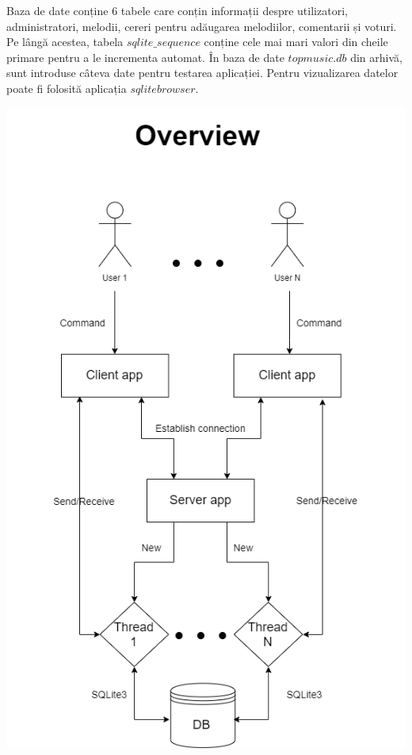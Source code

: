 \documentclass{article}
\begin{document}
Baza de date conține 6 tabele care conțin informații despre utilizatori, administratori, melodii, cereri pentru adăugarea melodiilor, comentarii și voturi. Pe lângă acestea, tabela $sqlite\_sequence$ conține cele mai mari valori din cheile primare pentru a le incrementa automat. În baza de date $topmusic.db$ din arhivă, sunt introduse câteva date pentru testarea aplicației. Pentru vizualizarea datelor poate fi folosită aplicația $sqlitebrowser$.

\pagebreak
\includegraphics[width=\textwidth]{overview}
\end{document}
